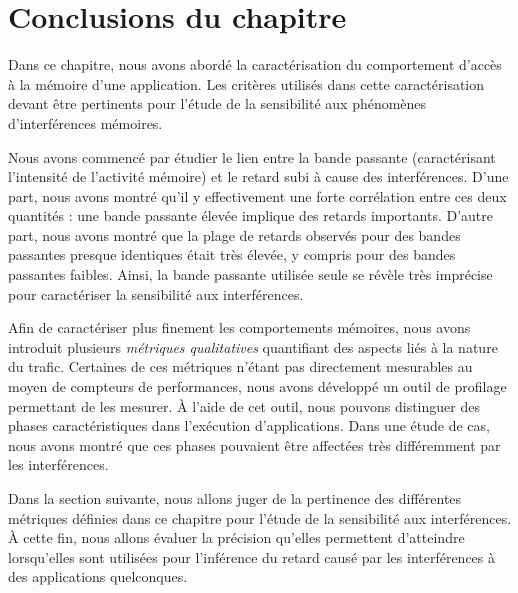 \section{Conclusions du chapitre}

Dans ce chapitre, nous avons abordé la caractérisation du comportement d'accès à la mémoire d'une application.
Les critères utilisés dans cette caractérisation devant être pertinents pour l'étude de la sensibilité aux phénomènes d'interférences mémoires.

Nous avons commencé par étudier le lien entre la bande passante (caractérisant l'intensité de l'activité mémoire) et le retard subi à cause des interférences.
D'une part, nous avons montré qu'il y effectivement une forte corrélation entre ces deux quantités : une bande passante élevée implique des retards importants.
D'autre part, nous avons montré que la plage de retards observés pour des bandes passantes presque identiques était très élevée, y compris pour des bandes passantes faibles.
Ainsi, la bande passante utilisée seule se révèle très imprécise pour caractériser la sensibilité aux interférences.

Afin de caractériser plus finement les comportements mémoires, nous avons introduit plusieurs \emph{métriques qualitatives} quantifiant des aspects liés à la nature du trafic.
Certaines de ces métriques n'étant pas directement mesurables au moyen de compteurs de performances, nous avons développé un outil de profilage permettant de les mesurer.
À l'aide de cet outil, nous pouvons distinguer des phases caractéristiques dans l'exécution d'applications.
Dans une étude de cas, nous avons montré que ces phases pouvaient être affectées très différemment par les interférences.

Dans la section suivante, nous allons juger de la pertinence des différentes métriques définies dans ce chapitre pour l'étude de la sensibilité aux interférences.
À cette fin, nous allons évaluer la précision qu'elles permettent d'atteindre lorsqu'elles sont utilisées pour l'inférence du retard causé par les interférences à des applications quelconques.
